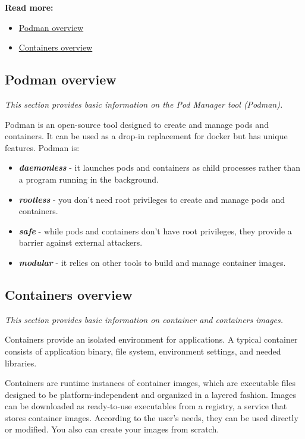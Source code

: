 \documentclass[11pt]{article}
\newenvironment{mditemize}%
    {\begin{itemize}
        \setlength{\parskip}{0.5\smallskipamount}}%
    {\end{itemize}}
\begin{document}
\textbf{Read more:}
\begin{mditemize}
 \item \hyperref[podman-overview]{Podman overview}
 \item \hyperref[container-overview]{Containers overview}
\end{mditemize}


\hypertarget{podman-overview}{%
\subsection{Podman overview}\label{podman-overview}}
 \textit{This section provides basic information on the Pod Manager tool (Podman).}

Podman is an open-source tool designed to create and manage pods and containers. It can be used as a drop-in replacement for docker but has unique features. Podman is:
\begin{mditemize}
 \item \textit{\textbf{daemonless}} - it launches pods and containers as child processes rather than a program running in the background.
\item \textit{\textbf{rootless}} - you don’t need root privileges to create and manage pods and containers.
\item \textit{\textbf{safe}} - while pods and containers don’t have root privileges, they provide a barrier against external attackers.
\item \textit{\textbf{modular}} - it relies on other tools to build and manage container images.
\end{mditemize}

\hypertarget{container-overview}{%
\subsection{Containers overview}\label{container-overview}}
 \textit{This section provides basic information on container and containers images.}

Containers provide an isolated environment for applications. A typical container consists of application binary, file system, environment settings, and needed libraries. 

Containers are runtime instances of container images, which are executable files designed to be platform-independent and organized in a layered fashion. Images can be downloaded as ready-to-use executables from a registry, a service that stores container images. According to the user's needs, they can be used directly or modified. You also can create your images from scratch.
 
\end{document}
